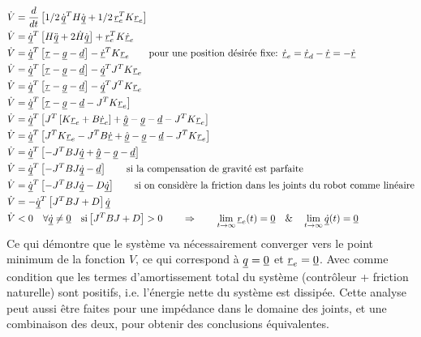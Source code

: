 \begin{align}
\dot{V} &= \frac{d}{dt} \left[ 1/2 \,  \dot{\col{q}}^T H \dot{\col{q}}  + 1/2 \, \col{r}_e^T K \col{r}_e \right]  \\
\dot{V} &= \dot{\col{q}}^T 
\left[ 
H \ddot{\col{q}} + 2 \dot{H} \dot{\col{q}}
\right] +
\col{r}_e^T K \col{\dot{r}}_e
\\%
\dot{V} &= \dot{\col{q}}^T 
\left[ 
\col{\tau} - \col{g} - \col{d}
\right] -
\col{\dot{r}}^T K \col{r}_e
\quad \quad
\text{pour une position désirée fixe: }  \col{\dot{r}}_e = \col{\dot{r}}_d - \col{\dot{r}} = - \col{\dot{r}}
\\%
\dot{V} &= \dot{\col{q}}^T 
\left[ 
\col{\tau} - \col{g} - \col{d}
\right] -
\col{\dot{q}}^T J^T K \col{r}_e
\\%
\dot{V} &= \dot{\col{q}}^T 
\left[ 
\col{\tau} - \col{g} - \col{d}
\right] -
\col{\dot{q}}^T J^T K \col{r}_e
\\%
\dot{V} &= \dot{\col{q}}^T 
\left[ 
\col{\tau} - \col{g} - \col{d}
- J^T K \col{r}_e
\right]
\\%
\dot{V} &= \dot{\col{q}}^T 
\left[ 
J^T   \left[ K \col{r}_e + B \col{\dot{r}}_e \right] + \col{\hat{g}}
- \col{g} - \col{d}
- J^T K \col{r}_e
\right]
\\%
\dot{V} &= \dot{\col{q}}^T 
\left[ 
J^T  K \col{r}_e 
- J^T B \col{\dot{r}}
+ \col{\hat{g}}
- \col{g} - \col{d}
- J^T K \col{r}_e
\right]
\\%
\dot{V} &= \dot{\col{q}}^T 
\left[ 
- J^T B J \col{\dot{q}}
+ \col{\hat{g}}
- \col{g} - \col{d}
\right]
\\%
\dot{V} &= \dot{\col{q}}^T 
\left[ 
- J^T B J \col{\dot{q}} - \col{d}
\right]
\quad \quad
\text{si la compensation de gravité est parfaite}
\\%
\dot{V} &= \dot{\col{q}}^T 
\left[ 
- J^T B J \col{\dot{q}} - D \col{\dot{q}}
\right]
\quad \quad
\text{si on considère la friction dans les joints du robot comme linéaire}
\\%
\dot{V} &= - \dot{\col{q}}^T 
\left[ 
J^T B J + D 
\right] \col{\dot{q}}
\\%
\dot{V} &< 0 \quad  
\forall \col{\dot{q}} \neq \col{0} \quad 
\text{si} \left[ J^T B J + D \right]  > 0
\quad\quad \Rightarrow \quad\quad
\lim_{t \rightarrow \infty} \col{r}_e(t) = \col{0} \quad \& \quad
\lim_{t \rightarrow \infty} \col{\dot{q}}(t) = \col{0}
\end{align} 
Ce qui démontre que le système va nécessairement converger vers le point minimum de la fonction $V$, ce qui correspond à $\underline{q} = \underline{0}$ et $\underline{r}_e = \underline{0}$. Avec comme condition que les termes d'amortissement total du système (contrôleur + friction naturelle) sont positifs, i.e. l'énergie nette du système est dissipée. Cette analyse peut aussi être faites pour une impédance dans le domaine des joints, et une combinaison des deux, pour obtenir des conclusions équivalentes. 


